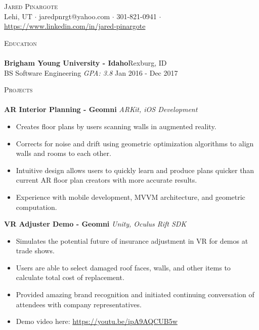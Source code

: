 \documentclass[a4paper]{article}
\newcommand{\lineunder} {
    \vspace*{-8pt} \\
    \hspace*{-18pt} \hrulefill \\
}
\newcommand{\header} [1] {
    {\hspace*{-18pt}\vspace*{6pt} \textsc{#1}}
    \vspace*{-6pt} \lineunder
}
\begin{document}
\vspace*{-40pt}

    

\vspace*{-10pt}
\begin{center}
	{\Huge \scshape {Jared Pinargote}}\\
	Lehi, UT $\cdot$ jaredpnrgt@yahoo.com $\cdot$ 301-821-0941 $\cdot$ \href{https://www.linkedin.com/in/jared-pinargote}{https://www.linkedin.com/in/jared-pinargote}
\end{center}

\header{Education}
\textbf{Brigham Young University - Idaho}\hfill Rexburg, ID\\
BS Software Engineering \textit{GPA: 3.8} \hfill Jan 2016 - Dec 2017\\
\vspace{2mm}

\header{Projects}
{\textbf{AR Interior Planning - Geomni}} {\sl ARKit, iOS Development} \\
\vspace{-3mm}
\begin{itemize} \itemsep 1pt
	\item Creates floor plans by users scanning walls in augmented reality.
	\item Corrects for noise and drift using geometric optimization algorithms to align walls and rooms to each other.
	\item Intuitive design allows users to quickly learn and produce plans quicker than current AR floor plan creators with more accurate results.
	\item Experience with mobile development, MVVM architecture, and geometric computation.
\end{itemize}

{\textbf{VR Adjuster Demo - Geomni}} {\sl Unity, Oculus Rift SDK} \\
\vspace{-3mm}
\begin{itemize} \itemsep 1pt
	\item Simulates the potential future of insurance adjustment in VR for demos at trade shows.
	\item Users are able to select damaged roof faces, walls, and other items to calculate total cost of replacement.
	\item Provided amazing brand recognition and initiated continuing conversation of attendees with company representatives.
	\item Demo video here: \href{https://youtu.be/ipA9AQCUB5w}{https://youtu.be/ipA9AQCUB5w}
\end{itemize}
\end{document}
